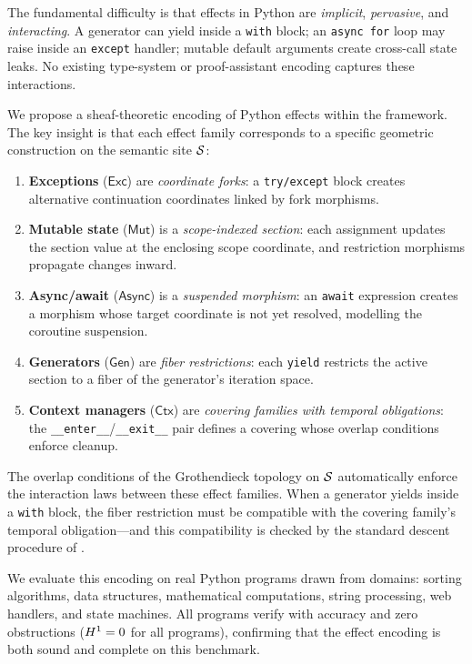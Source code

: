 \documentclass[11pt]{article}
\newcommand{\Exc}{\mathsf{Exc}}          %
\newcommand{\Mut}{\mathsf{Mut}}          %
\newcommand{\Async}{\mathsf{Async}}      %
\newcommand{\Gen}{\mathsf{Gen}}          %
\newcommand{\Ctx}{\mathsf{Ctx}}          %
\begin{document}
The fundamental difficulty is that effects in Python are \emph{implicit},
\emph{pervasive}, and \emph{interacting}.  A generator can yield inside a
\texttt{with} block; an \texttt{async for} loop may raise inside an
\texttt{except} handler; mutable default arguments create cross-call state
leaks.  No existing type-system or proof-assistant encoding captures these
interactions.

We propose a sheaf-theoretic encoding of Python effects within the
\JuGeo{} framework.  The key insight is that each effect family corresponds
to a specific geometric construction on the semantic site $\mathcal{S}$:

\begin{enumerate}[nosep]
\item \textbf{Exceptions} ($\Exc$) are \emph{coordinate forks}:
  a \texttt{try/except} block creates alternative continuation coordinates
  linked by fork morphisms.
\item \textbf{Mutable state} ($\Mut$) is a \emph{scope-indexed section}:
  each assignment updates the section value at the enclosing scope coordinate,
  and restriction morphisms propagate changes inward.
\item \textbf{Async/await} ($\Async$) is a \emph{suspended morphism}:
  an \texttt{await} expression creates a morphism whose target coordinate
  is not yet resolved, modelling the coroutine suspension.
\item \textbf{Generators} ($\Gen$) are \emph{fiber restrictions}:
  each \texttt{yield} restricts the active section to a fiber of the
  generator's iteration space.
\item \textbf{Context managers} ($\Ctx$) are \emph{covering families
  with temporal obligations}: the \texttt{\_\_enter\_\_}/\texttt{\_\_exit\_\_}
  pair defines a covering whose overlap conditions enforce cleanup.
\end{enumerate}

The overlap conditions of the Grothendieck topology on $\mathcal{S}$ automatically
enforce the interaction laws between these effect families.  When a generator
yields inside a \texttt{with} block, the fiber restriction must be compatible
with the covering family's temporal obligation---and this compatibility is
checked by the standard descent procedure of \JuGeo{}.

We evaluate this encoding on \expTotalPrograms{} real Python programs drawn
from \expDomainCount{} domains: sorting algorithms, data structures,
mathematical computations, string processing, web handlers, and state
machines.  All \expVerified{} programs verify with \expAccuracy{} accuracy
and zero obstructions ($H^{1} = 0$ for all programs), confirming that
the effect encoding is both sound and complete on this benchmark.
\end{document}
